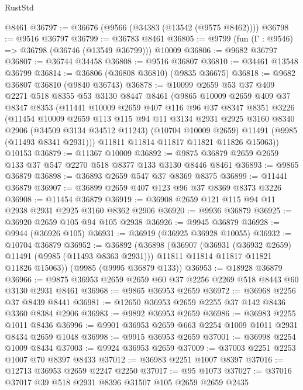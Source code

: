 \begin{lexlean}{RustStd}
\begin{coremodule}
    @8461
@36797 := @36676 (@9566 (@34383 (@13542 (@9575 @8462))))
@36798 := @9516 @36797
@36799 := @36783 @8461
@36805 := @9799 (fun (Γ : @9546) => @36798 (@36746 (@13549 @36799))) @10009
@36806 := @9682 @36797
@36807 := @36744 @34458
@36808 := @9516 @36807
@36810 := @34461 @13548 @36799
@36814 := @36806 (@36808 @36810) (@9835 @36675)
@36818 := @9682 @36807 @36810 (@9840 @36743)
@36878 := @10099
    @2659
    @53
    @37
    @409
    @2271
    @518
    @8355
    @53
    @3130
    @8447
    @8461
    (@9865
      @10009
      @2659
      @409
      @37
      @8347
      @8353
      (@11441
        @10009
        @2659
        @407
        @116
        @96
        @37
        @8347
        @8351
        @3226
        (@11454
          @10009
          @2659
          @113
          @115
          @94
          @11
          @3134
          @2931
          @2925
          @3160
          @8340
          @2906
          (@34509 @3134 @34512 @11243)
          (@10704 @10009 @2659)
          @11491
          (@9985 (@11493 @8341 @2931)))
        @11811
        @11814
        @11817
        @11821
        @11826
        @15063))
    @10153
@36879 := @11367 @10009
@36892 := @9875 @36879 @2659 @2659 @133 @37 @547 @2270 @518 @8377 @133 @3130 @8446 @8461
@36893 := @9865 @36879
@36898 := @36893 @2659 @547 @37 @8369 @8375
@36899 := @11441 @36879
@36907 := @36899 @2659 @407 @123 @96 @37 @8369 @8373 @3226
@36908 := @11454 @36879
@36919 := @36908 @2659 @121 @115 @94 @11 @2938 @2931 @2925 @3160 @8362 @2906
@36920 := @9936 @36879
@36925 := @36920 @2659 @105 @94 @105 @2938
@36926 := @9945 @36879
@36928 := @9944 (@36926 @105)
@36931 := @36919 (@36925 @36928 @10055)
@36932 := @10704 @36879
@36952 := @36892
    (@36898
      (@36907
        (@36931 (@36932 @2659) @11491 (@9985 (@11493 @8363 @2931)))
        @11811
        @11814
        @11817
        @11821
        @11826
        @15063))
    (@9985 (@9995 @36879 @133))
@36953 := @18928 @36879
@36966 := @9875 @36953 @2659 @2659 @60 @37 @2256 @2269 @518 @8443 @60 @3130 @2931 @8461
@36968 := @9865 @36953 @2659
@36972 := @36968 @2256 @37 @8439 @8441
@36981 := @12650 @36953 @2659 @2255 @37 @142 @8436 @3360 @8384 @2906
@36983 := @9892 @36953 @2659
@36986 := @36983 @2255 @1011 @8436
@36996 := @9901 @36953 @2659 @663 @2254 @1009 @1011 @2931 @8434 @2659 @1048
@36998 := @9915 @36953 @2659
@37001 := @36998 @2254 @1009 @8434
@37003 := @9924 @36953 @2659
@37009 := @37003 @2251 @2253 @1007 @70 @8397 @8433
@37012 := @36983 @2251 @1007 @8397
@37016 := @12713 @36953 @2659 @2247 @2250
@37017 := @95 @1073
@37027 := @37016 @37017 @39 @518 @2931 @8396 @31507 @105 @2659 @2659 @2435

\end{coremodule}
\end{lexlean}
